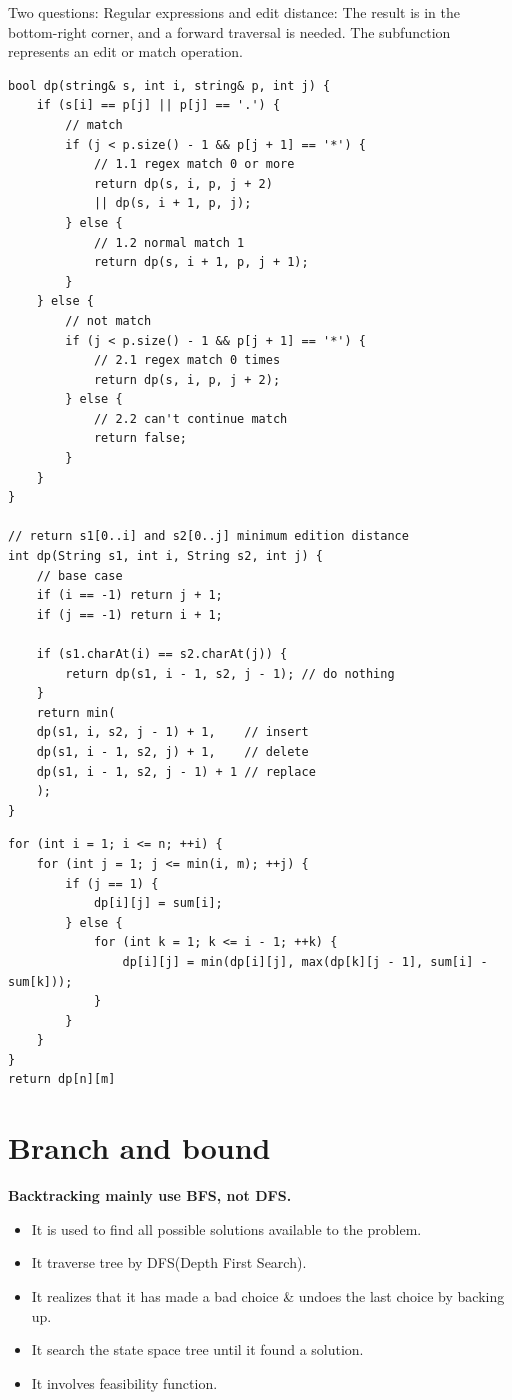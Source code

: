 \documentclass[a4paper,11pt,twoside]{book}
\begin{document}
	\par Two questions: Regular expressions and edit distance: The result is in the bottom-right corner, and a forward traversal is needed. The subfunction represents an edit or match operation.
\begin{lstlisting}
bool dp(string& s, int i, string& p, int j) {
	if (s[i] == p[j] || p[j] == '.') {
		// match
		if (j < p.size() - 1 && p[j + 1] == '*') {
			// 1.1 regex match 0 or more
			return dp(s, i, p, j + 2)
			|| dp(s, i + 1, p, j);
		} else {
			// 1.2 normal match 1 
			return dp(s, i + 1, p, j + 1);
		}
	} else {
		// not match 
		if (j < p.size() - 1 && p[j + 1] == '*') {
			// 2.1 regex match 0 times
			return dp(s, i, p, j + 2);
		} else {
			// 2.2 can't continue match
			return false;
		}
	}
}

// return s1[0..i] and s2[0..j] minimum edition distance
int dp(String s1, int i, String s2, int j) {
	// base case
	if (i == -1) return j + 1;
	if (j == -1) return i + 1;
	
	if (s1.charAt(i) == s2.charAt(j)) {
		return dp(s1, i - 1, s2, j - 1); // do nothing
	}
	return min(
	dp(s1, i, s2, j - 1) + 1,    // insert
	dp(s1, i - 1, s2, j) + 1,    // delete
	dp(s1, i - 1, s2, j - 1) + 1 // replace
	);
}		
\end{lstlisting}	
	

\begin{lstlisting}	
for (int i = 1; i <= n; ++i) {
	for (int j = 1; j <= min(i, m); ++j) {
		if (j == 1) {
			dp[i][j] = sum[i];
		} else {
			for (int k = 1; k <= i - 1; ++k) {
				dp[i][j] = min(dp[i][j], max(dp[k][j - 1], sum[i] - sum[k]));
			}
		}
	}
}
return dp[n][m]	
\end{lstlisting}	
	

	


\section{Branch and bound}

	\par \textbf{Backtracking mainly use BFS, not DFS.} 
\begin{itemize}
\item It is used to find all possible solutions available to the problem.

\item It traverse tree by DFS(Depth First Search).

\item It realizes that it has made a bad choice \& undoes the last choice by backing up.

\item It search the state space tree until it found a solution.

\item It involves feasibility function.
\end{itemize}
\end{document}
